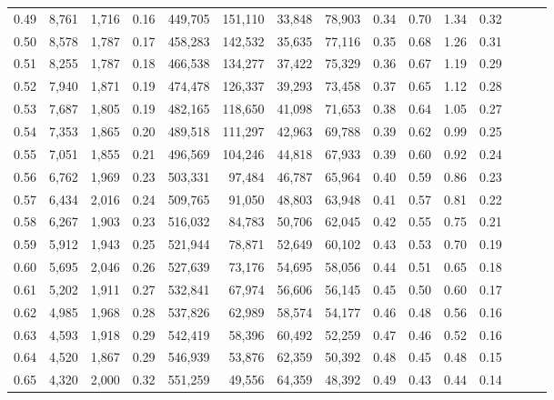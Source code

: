 \begin{tabular}{rrrrrrrrrrrrrrr}
0.49 &   8,761 &  1,716 &  0.16 &  449,705 &  151,110 &   33,848 &   78,903 &  0.34 &  0.70 &  1.34 &      0.32 \\
0.50 &   8,578 &  1,787 &  0.17 &  458,283 &  142,532 &   35,635 &   77,116 &  0.35 &  0.68 &  1.26 &      0.31 \\
0.51 &   8,255 &  1,787 &  0.18 &  466,538 &  134,277 &   37,422 &   75,329 &  0.36 &  0.67 &  1.19 &      0.29 \\
0.52 &   7,940 &  1,871 &  0.19 &  474,478 &  126,337 &   39,293 &   73,458 &  0.37 &  0.65 &  1.12 &      0.28 \\
0.53 &   7,687 &  1,805 &  0.19 &  482,165 &  118,650 &   41,098 &   71,653 &  0.38 &  0.64 &  1.05 &      0.27 \\
0.54 &   7,353 &  1,865 &  0.20 &  489,518 &  111,297 &   42,963 &   69,788 &  0.39 &  0.62 &  0.99 &      0.25 \\
0.55 &   7,051 &  1,855 &  0.21 &  496,569 &  104,246 &   44,818 &   67,933 &  0.39 &  0.60 &  0.92 &      0.24 \\
0.56 &   6,762 &  1,969 &  0.23 &  503,331 &   97,484 &   46,787 &   65,964 &  0.40 &  0.59 &  0.86 &      0.23 \\
0.57 &   6,434 &  2,016 &  0.24 &  509,765 &   91,050 &   48,803 &   63,948 &  0.41 &  0.57 &  0.81 &      0.22 \\
0.58 &   6,267 &  1,903 &  0.23 &  516,032 &   84,783 &   50,706 &   62,045 &  0.42 &  0.55 &  0.75 &      0.21 \\
0.59 &   5,912 &  1,943 &  0.25 &  521,944 &   78,871 &   52,649 &   60,102 &  0.43 &  0.53 &  0.70 &      0.19 \\
0.60 &   5,695 &  2,046 &  0.26 &  527,639 &   73,176 &   54,695 &   58,056 &  0.44 &  0.51 &  0.65 &      0.18 \\
0.61 &   5,202 &  1,911 &  0.27 &  532,841 &   67,974 &   56,606 &   56,145 &  0.45 &  0.50 &  0.60 &      0.17 \\
0.62 &   4,985 &  1,968 &  0.28 &  537,826 &   62,989 &   58,574 &   54,177 &  0.46 &  0.48 &  0.56 &      0.16 \\
0.63 &   4,593 &  1,918 &  0.29 &  542,419 &   58,396 &   60,492 &   52,259 &  0.47 &  0.46 &  0.52 &      0.16 \\
0.64 &   4,520 &  1,867 &  0.29 &  546,939 &   53,876 &   62,359 &   50,392 &  0.48 &  0.45 &  0.48 &      0.15 \\
0.65 &   4,320 &  2,000 &  0.32 &  551,259 &   49,556 &   64,359 &   48,392 &  0.49 &  0.43 &  0.44 &      0.14 \\

\end{tabular}
